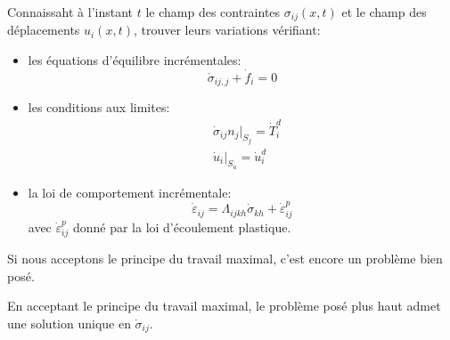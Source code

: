 \begin{defn}
    Connaissaht à l'instant $t$ le champ des contraintes $\sigma_{ij}(x,t)$ et le champ des déplacements $u_i(x,t)$, trouver leurs variations vérifiant: 
    \begin{itemize}
        \item les équations d'équilibre incrémentales: 
            \begin{equation}
                \dot{\sigma}_{ij,j} + \dot{f}_i = 0
                \label{eq:Ch10-043}
            \end{equation}
        \item les conditions aux limites: 
            \begin{equation}\begin{aligned}
                &\dot{\sigma}_{ij} n_j|_{S_f} = \dot{T}_i^d\\
                &\dot{u}_i|_{S_u} = \dot{u}_i^d
            \end{aligned}
                \label{eq:Ch10-045}
            \end{equation}
        \item la loi de comportement incrémentale: 
            \begin{equation}
                \dot{\varepsilon}_{ij} = \Lambda_{ijkh} \dot{\sigma}_{kh} + \dot{\varepsilon}_{ij}^p
                \label{eq:Ch10-046}
            \end{equation}
            avec $\dot{\varepsilon}_{ij}^p$ donné par la loi d'écoulement plastique.
    \end{itemize}
\end{defn}
Si nous acceptons le principe du travail maximal, c'est encore 
un problème bien posé.
\begin{thmn}
    En acceptant le principe du travail maximal, le problème posé plus haut admet une solution unique en $\dot{\sigma}_{ij}$.
\end{thmn}
